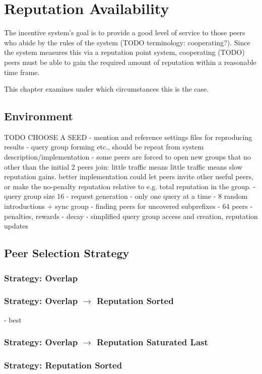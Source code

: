 \chapter{Reputation Availability}
The incentive system's goal is to provide a good level of service to those peers
who abide by the rules of the system (TODO terminology: cooperating?). Since the
system measures this via a reputation point system, cooperating (TODO) peers
must be able to gain the required amount of reputation within a reasonable time
frame.

This chapter examines under which circumstances this is the case.

\section{Environment}
TODO CHOOSE A SEED
- mention and reference settings files for reproducing results
- query group forming etc., should be repeat from system
  description/implementation
- some peers are forced to open new groups that no other than the initial 2
  peers join: little traffic means little traffic means slow reputation gains.
  better implementation could let peers invite other useful peers, or make the
  no-penalty reputation relative to e.g. total reputation in the group.
- query group size 16
- request generation
- only one query at a time
- 8 random introductions + sync group
- finding peers for uncovered subprefixes
- 64 peers
- penalties, rewards
- decay
- simplified query group access and creation, reputation updates

\section{Peer Selection Strategy}
\subsection{Strategy: Overlap}
\subsection{Strategy: Overlap $\rightarrow$ Reputation Sorted}
- best
\subsection{Strategy: Overlap $\rightarrow$ Reputation Saturated Last}
\subsection{Strategy: Reputation Sorted}
